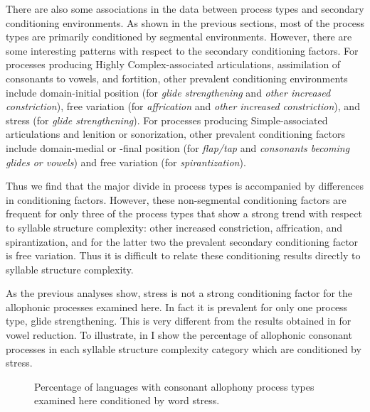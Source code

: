   There are also some associations in the data between process types and secondary conditioning environments. As shown in the previous sections, most of the process types are primarily conditioned by segmental environments. However, there are some interesting patterns with respect to the secondary conditioning factors. For processes producing Highly Complex-associated articulations, assimilation of consonants to vowels, and fortition, other prevalent conditioning environments include domain-initial position (for \textit{glide strengthening} and \textit{other increased constriction}), free variation (for \textit{affrication} and \textit{other increased constriction}), and stress (for \textit{glide strengthening}). For processes producing Simple-associated articulations and lenition or sonorization, other prevalent conditioning factors include domain-medial or -final position (for \textit{flap/tap} and \textit{consonants becoming glides or vowels}) and free variation (for \textit{spirantization}). 

  Thus we find that the major divide in process types is accompanied by differences in conditioning factors. However, these non-segmental conditioning factors are frequent for only three of the process types that show a strong trend with respect to syllable structure complexity: other increased constriction, affrication, and spirantization, and for the latter two the prevalent secondary conditioning factor is free variation. Thus it is difficult to relate these conditioning results directly to syllable structure complexity.

  As the previous analyses show, stress is not a strong conditioning factor for the allophonic processes examined here. In fact it is prevalent for only one process type, glide strengthening. This is very different from the results obtained in  for vowel reduction. To illustrate, in  I show the percentage of allophonic consonant processes in each syllable structure complexity category which are conditioned by stress.

  
\begin{figure}
\caption{\label{fig:7.11}Percentage of languages with consonant allophony process types examined here conditioned by word stress.}
\end{figure}

